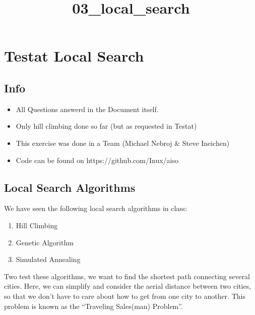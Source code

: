 \documentclass[11pt]{article}
\title{03\_local\_search}
\providecommand{\tightlist}{%
      \setlength{\itemsep}{0pt}\setlength{\parskip}{0pt}}
\begin{document}
    
    
    \maketitle
    
    

    
    \hypertarget{testat-local-search}{%
\section{Testat Local Search}\label{testat-local-search}}

\hypertarget{info}{%
\subsection{Info}\label{info}}

\begin{itemize}
\tightlist
\item
  All Questions answerd in the Document itself.
\item
  Only hill climbing done so far (but as requested in Testat)
\item
  This exercise was done in a Team (Michael Nebroj \& Steve Ineichen)
\item
  Code can be found on https://github.com/Inux/aiso
\end{itemize}

    \hypertarget{local-search-algorithms}{%
\subsection{Local Search Algorithms}\label{local-search-algorithms}}

We have seen the following local search algorithms in class:

\begin{enumerate}
\def\labelenumi{\arabic{enumi}.}
\tightlist
\item
  Hill Climbing
\item
  Genetic Algorithm
\item
  Simulated Annealing
\end{enumerate}

Two test these algorithms, we want to find the shortest path connecting
several cities. Here, we can simplify and consider the aerial distance
between two cities, so that we don't have to care about how to get from
one city to another. This problem is known as the ``Traveling Sales(man)
Problem''.
\end{document}
